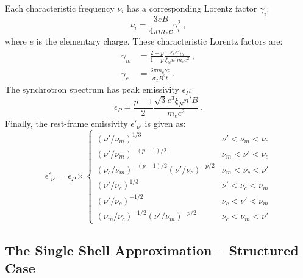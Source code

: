 \documentclass[twocolumn]{aastex62}
\newcommand{\epse}{\ensuremath{\varepsilon_{\mathrm{e}}}}
\newcommand{\xiN}{\ensuremath{\xi_N}}
\begin{document}
Each characteristic frequency $\nu_i$ has a corresponding Lorentz factor $\gamma_i$:
\begin{equation}
	\nu_i = \frac{3e B}{4 \pi m_e c}  \gamma_i^2 \ ,
\end{equation}
where $e$ is the elementary charge.  These characteristic Lorentz factors are:
\begin{align}
	\gamma_m &= \frac{2-p}{1-p} \frac{\epse e'_{th}}{\xiN n' m_e c^2}\ , \\
	\gamma_c &= \frac{6\pi m_e \gamma c}{\sigma_T B^2 t}\ .
\end{align}
The synchrotron spectrum has peak emissivity $\epsilon_P$:
\begin{equation}
	\epsilon_P = \frac{p-1}{2}\frac{\sqrt{3} e^3 \xiN n' B}{m_e c^2}\ .
\end{equation}
Finally, the rest-frame emissivity $\epsilon'_{\nu'}$ is given as:
\begin{equation}
	\epsilon'_{\nu'} = \epsilon_P \times \begin{cases}
					(\nu' / \nu_m)^{1/3} & \nu' < \nu_m < \nu_c \\
					(\nu' / \nu_m)^{-(p-1)/2} & \nu_m < \nu' < \nu_c \\
					(\nu_c / \nu_m)^{-(p-1)/2}(\nu' / \nu_c)^{-p/2} & \nu_m < \nu_c < \nu' \\
					(\nu' / \nu_c)^{1/3} & \nu' < \nu_c < \nu_m \\
					(\nu' / \nu_c)^{-1/2} & \nu_c < \nu' < \nu_m \\
					(\nu_m / \nu_c)^{-1/2}(\nu' / \nu_m)^{-p/2} & \nu_c < \nu_m < \nu'
				\end{cases} \label{eq:syncSpec}
\end{equation}

\subsection{The Single Shell Approximation -- Structured Case} \label{subsec:algo2}
\end{document}
